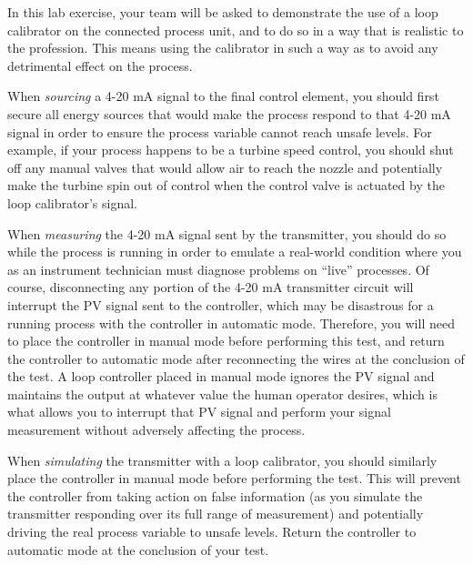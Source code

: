 \vskip 10pt

In this lab exercise, your team will be asked to demonstrate the use of a loop calibrator on the connected process unit, and to do so in a way that is realistic to the profession.  This means using the calibrator in such a way as to avoid any detrimental effect on the process.

When {\it sourcing} a 4-20 mA signal to the final control element, you should first secure all energy sources that would make the process respond to that 4-20 mA signal in order to ensure the process variable cannot reach unsafe levels.  For example, if your process happens to be a turbine speed control, you should shut off any manual valves that would allow air to reach the nozzle and potentially make the turbine spin out of control when the control valve is actuated by the loop calibrator's signal.  

When {\it measuring} the 4-20 mA signal sent by the transmitter, you should do so while the process is running in order to emulate a real-world condition where you as an instrument technician must diagnose problems on ``live'' processes.  Of course, disconnecting any portion of the 4-20 mA transmitter circuit will interrupt the PV signal sent to the controller, which may be disastrous for a running process with the controller in automatic mode.  Therefore, you will need to place the controller in manual mode before performing this test, and return the controller to automatic mode after reconnecting the wires at the conclusion of the test.  A loop controller placed in manual mode ignores the PV signal and maintains the output at whatever value the human operator desires, which is what allows you to interrupt that PV signal and perform your signal measurement without adversely affecting the process.

When {\it simulating} the transmitter with a loop calibrator, you should similarly place the controller in manual mode before performing the test.  This will prevent the controller from taking action on false information (as you simulate the transmitter responding over its full range of measurement) and potentially driving the real process variable to unsafe levels.  Return the controller to automatic mode at the conclusion of your test.

